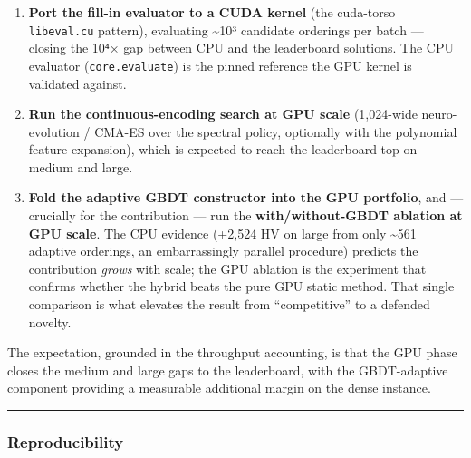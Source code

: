 \documentclass[
  11pt,
]{article}
\providecommand{\tightlist}{%
  \setlength{\itemsep}{0pt}\setlength{\parskip}{0pt}}
\begin{document}
\begin{enumerate}
\def\labelenumi{\arabic{enumi}.}
\tightlist
\item
  \textbf{Port the fill-in evaluator to a CUDA kernel} (the cuda-torso
  \texttt{libeval.cu} pattern), evaluating \textasciitilde10³ candidate
  orderings per batch --- closing the 10⁴× gap between CPU and the
  leaderboard solutions. The CPU evaluator (\texttt{core.evaluate}) is
  the pinned reference the GPU kernel is validated against.
\item
  \textbf{Run the continuous-encoding search at GPU scale} (1,024-wide
  neuro-evolution / CMA-ES over the spectral policy, optionally with the
  polynomial feature expansion), which is expected to reach the
  leaderboard top on medium and large.
\item
  \textbf{Fold the adaptive GBDT constructor into the GPU portfolio},
  and --- crucially for the contribution --- run the
  \textbf{with/without-GBDT ablation at GPU scale}. The CPU evidence
  (+2,524 HV on large from only \textasciitilde561 adaptive orderings,
  an embarrassingly parallel procedure) predicts the contribution
  \emph{grows} with scale; the GPU ablation is the experiment that
  confirms whether the hybrid beats the pure GPU static method. That
  single comparison is what elevates the result from ``competitive'' to
  a defended novelty.
\end{enumerate}

The expectation, grounded in the throughput accounting, is that the GPU
phase closes the medium and large gaps to the leaderboard, with the
GBDT-adaptive component providing a measurable additional margin on the
dense instance.

\begin{center}\rule{0.5\linewidth}{0.5pt}\end{center}

\hypertarget{reproducibility}{%
\subsubsection{Reproducibility}\label{reproducibility}}
\end{document}
